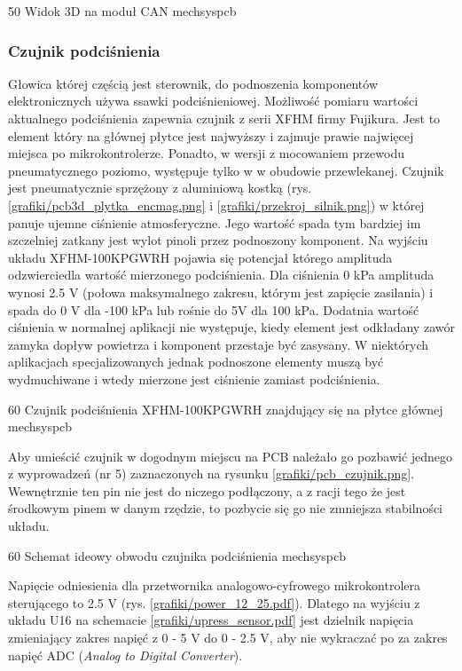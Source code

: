 	{50}
	{Widok 3D na moduł CAN}
	{mechsyspcb}
	
\subsubsection{Czujnik podciśnienia}

Głowica której częścią jest sterownik, do podnoszenia komponentów elektronicznych używa ssawki podciśnieniowej. Możliwość pomiaru wartości aktualnego podciśnienia zapewnia czujnik z serii XFHM firmy Fujikura. Jest to element który na głównej płytce jest najwyższy i zajmuje prawie najwięcej miejsca po mikrokontrolerze. Ponadto, w wersji z mocowaniem przewodu pneumatycznego poziomo, występuje tylko w w obudowie przewlekanej. Czujnik jest pneumatycznie sprzężony z aluminiową kostką (rys. \ref{grafiki/pcb3d_plytka_encmag.png} i \ref{grafiki/przekroj_silnik.png}) w której panuje ujemne ciśnienie atmosferyczne. Jego wartość spada tym bardziej im szczelniej zatkany jest wylot pinoli przez podnoszony komponent. Na wyjściu układu XFHM-100KPGWRH pojawia się potencjał którego amplituda odzwierciedla wartość mierzonego podciśnienia. Dla ciśnienia 0 kPa amplituda wynosi 2.5 V (połowa maksymalnego zakresu, którym jest zapięcie zasilania) i spada do 0 V dla -100 kPa lub rośnie do 5V dla 100 kPa. Dodatnia wartość ciśnienia w normalnej aplikacji nie występuje, kiedy element jest odkładany zawór zamyka dopływ powietrza i komponent przestaje być zasysany. W niektórych aplikacjach specjalizowanych jednak podnoszone elementy muszą być wydmuchiwane i wtedy mierzone jest ciśnienie zamiast podciśnienia.

	{60}
	{Czujnik podciśnienia XFHM-100KPGWRH znajdujący się na płytce głównej}
	{mechsyspcb}

Aby umieścić czujnik w dogodnym miejscu na PCB należało go pozbawić jednego z wyprowadzeń (nr 5) zaznaczonych na rysunku \ref{grafiki/pcb_czujnik.png}. Wewnętrznie ten pin nie jest do niczego podłączony, a z racji tego że jest środkowym pinem w danym rzędzie, to pozbycie się go nie zmniejsza stabilności układu.

	{60}
	{Schemat ideowy obwodu czujnika podciśnienia}
	{mechsyspcb}

Napięcie odniesienia dla przetwornika analogowo-cyfrowego mikrokontrolera sterującego to 2.5 V (rys. \ref{grafiki/power_12_25.pdf}). Dlatego na wyjściu z układu U16 na schemacie \ref{grafiki/upress_sensor.pdf} jest dzielnik napięcia zmieniający zakres napięć z 0 - 5 V do 0 - 2.5 V, aby nie wykraczać po za zakres napięć ADC ({\it Analog to Digital Converter}).

